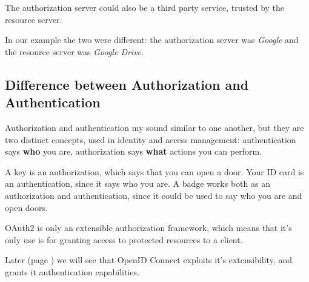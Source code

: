 The authorization server could also be a third party service, trusted by the
resource server.

In our example the two were different: the authorization server was
\textit{Google} and the resource server was \textit{Google Drive}.

\subsection{Difference between Authorization and Authentication}
Authorization and authentication my sound similar to one another, but they are
two distinct concepts, used in identity and access management:
authentication says \textbf{who} you are, authorization says \textbf{what}
actions you can perform.

A key is an authorization, which says that you can open a door. Your ID card is
an authentication, since it says who you are.
A badge works both as an authorization and authentication, since it could be
used to say who you are and open doors.

OAuth2 is only an extensible authorization framework, which means that it's
only use is for granting access to protected resources to a client.

Later (page \pageref{openid}) we will see that OpenID Connect exploits it's
extensibility, and grants it authentication capabilities.
